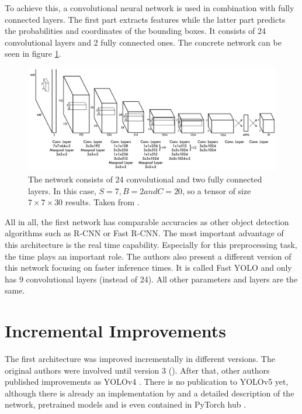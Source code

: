 To achieve this, a convolutional neural network is used in combination with fully connected layers. The first part extracts features while the latter part predicts the probabilities and coordinates of the bounding boxes. It consists of 24 convolutional layers and 2 fully connected ones. The concrete network can be seen in figure \ref{fig:YOLO_network}. \\


\begin{figure}[htb!]
	\centering
	\includegraphics[scale=0.25]{figures/YOLO_network.png}
	\caption{The network consists of 24 convolutional and two fully connected layers. In this case, $ S = 7, B = 2 and C = 20 $, so a tensor of size $ 7 \times 7 \times 30 $ results. Taken from \cite{yolov1}.}
	\label{fig:YOLO_network}
\end{figure}

All in all, the first network has comparable accuracies as other object detection algorithms such as R-CNN or Fast R-CNN. The most important advantage of this architecture is the real time capability. Especially for this preprocessing task, the time plays an important role. The authors also present a different version of this network focusing on faster inference times. It is called Fast YOLO and only has 9 convolutional layers (instead of 24). All other parameters and layers are the same.

\section{Incremental Improvements}

The first architecture was improved incrementally in different versions. The original authors were involved until version 3 (\cite{yolov1, yolov2, yolov3}). After that, other authors published improvements as YOLOv4 \cite{yolov4}. There is no publication to YOLOv5 yet, although there is already an implementation by \cite{yolov5} and a detailed description of the network, pretrained models and is even contained in PyTorch hub \cite{pytorch_hub_yolov5}. \\

